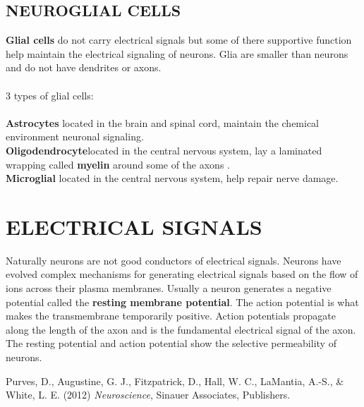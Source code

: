 \documentclass[english]{def}
\begin{document}
\subsection{NEUROGLIAL CELLS}


\textbf{Glial cells} do not carry electrical signals but some of there supportive function help maintain the electrical signaling of neurons.
Glia are smaller than neurons and do not have dendrites or axons.\\\\
3 types of glial cells:\\\\
\textbf{Astrocytes} located in the brain and spinal cord, maintain the chemical environment neuronal signaling.\\
\textbf{Oligodendrocyte}located in the central nervous system, lay a laminated wrapping called \textbf{myelin} around some of the axons .\\
\textbf{Microglial} located in the central nervous system, help repair nerve damage.\\


\section{ELECTRICAL SIGNALS}

Naturally neurons are not good conductors of electrical signals. Neurons have evolved complex mechanisms for generating electrical signals based on the flow of ions across their plasma membranes. Usually a neuron generates a negative potential called the \textbf{resting membrane potential}. The action potential is what makes the transmembrane temporarily positive. Action potentials propagate along the length of the axon and is the fundamental  electrical signal of the axon. The resting potential and action potential show the selective permeability of neurons.  






\begin{thebibliography}{9}
Purves, D., Augustine, G. J., Fitzpatrick, D., Hall, W. C., LaMantia, A.-S., \& White, L. E. (2012) \emph{Neuroscience}, Sinauer Associates, Publishers.
\end{thebibliography}
\end{document}
